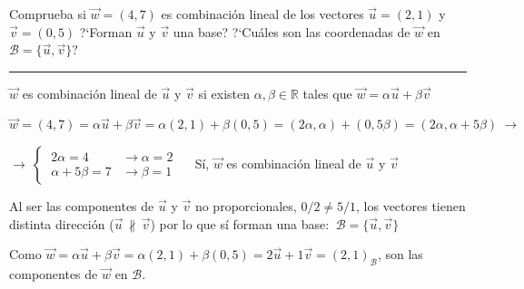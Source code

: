 \begin{miejercicio}

Comprueba si $\vec w=(4,7)$ es combinación lineal de los vectores $\vec u=(2,1)$ y $\vec v=(0,5)$ ?`Forman $\vec u$ y $\vec v$ una base? ?`Cuáles son las coordenadas de $\vec w$ en $\mathcal B=\{ \vec u, \vec v \}$?

\rule{250pt}{0.1pt}

\vspace{2mm} $\vec w$ es combinación lineal de $\vec u$ y $\vec v$ si existen $\alpha,\beta \in \mathbb R$ tales que $\vec w=\alpha \vec u + \beta \vec v$

\vspace{2mm} $\vec w=(4,7)=\alpha \vec u + \beta \vec v=\alpha(2,1)+\beta(0,5)=(2\alpha,\alpha)+(0,5\beta)=(2\alpha,\alpha+5\beta) \ \to $

\vspace{2mm} $\to \ \begin{cases} \ 2\alpha=4 &\to \alpha=2 \\ \ \alpha+5\beta=7 &\to \beta = 1 \end{cases}\quad $ Sí, $\vec w$ es combinación lineal de $\vec u$ y $\vec v$

\vspace{2mm} Al ser las componentes de $\vec u$ y $\vec v$ no proporcionales, $0/2 \neq 5/1$, los vectores tienen distinta dirección ($\vec u \, \not \parallel \, \vec v$) por lo que sí forman una base: $\ \mathcal B=\{\vec u,\vec v\}$

\vspace{2mm} Como  $\vec w=\alpha \vec u + \beta \vec v=\alpha(2,1)+\beta(0,5)=2\vec u+1\vec v=(2,1)_{\mathcal B}$, son las componentes de $\vec w$ en $\mathcal B$.

\vspace{2mm} 
\end{miejercicio}


